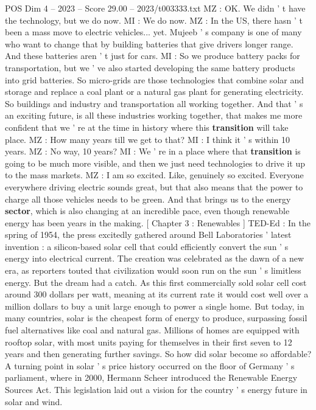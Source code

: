\begin{textsample}{POS Dim 4 – 2023 – Score 29.00 – 2023/t003333.txt}
MZ : OK.
We didn ' t have the technology, but we do now.
MI : We do now.
MZ : In the US, there hasn ' t been a mass move to electric vehicles... yet.
Mujeeb ' s company is one of many who want to change that by building batteries that give drivers longer range.
And these batteries aren ' t just for cars.
MI : So we produce battery packs for transportation, but we ' ve also started developing the same battery products into grid batteries.
So micro-grids are those technologies that combine solar and storage and replace a coal plant or a natural gas plant for generating electricity.
So buildings and industry and transportation all working together.
And that ' s an exciting future, is all these industries working together, that makes me more confident that we ' re at the time in history where this \textbf{transition} will take place.
MZ : How many years till we get to that?
MI : I think it ' s within 10 years.
MZ : No way, 10 years?
MI : We ' re in a place where that \textbf{transition} is going to be much more visible, and then we just need technologies to drive it up to the mass markets.
MZ : I am so excited.
Like, genuinely so excited.
Everyone everywhere driving electric sounds great, but that also means that the power to charge all those vehicles needs to be green.
And that brings us to the energy \textbf{sector}, which is also changing at an incredible pace, even though renewable energy has been years in the making. [ Chapter 3 : Renewables ] TED-Ed : In the spring of 1954, the press excitedly gathered around Bell Laboratories ' latest invention : a silicon-based solar cell that could efficiently convert the sun ' s energy into electrical current.
The creation was celebrated as the dawn of a new era, as reporters touted that civilization would soon run on the sun ' s limitless energy.
But the dream had a catch.
As this first commercially sold solar cell cost around 300 dollars per watt, meaning at its current rate it would cost well over a million dollars to buy a unit large enough to power a single home.
But today, in many countries, solar is the cheapest form of energy to produce, surpassing fossil fuel alternatives like coal and natural gas.
Millions of homes are equipped with rooftop solar, with most units paying for themselves in their first seven to 12 years and then generating further savings.
So how did solar become so affordable?
A turning point in solar ' s price history occurred on the floor of Germany ' s parliament, where in 2000, Hermann Scheer introduced the Renewable Energy Sources Act.
This legislation laid out a vision for the country ' s energy future in solar and wind.

\end{textsample}

